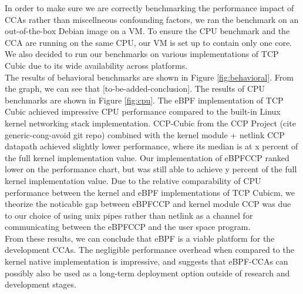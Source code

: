 \documentclass[../main.tex]{subfiles}
\begin{document}
In order to make sure we are correctly benchmarking the performance impact of CCAs rather than miscellneous confounding factors, we ran the benchmark on an out-of-the-box Debian image on a VM. To ensure the CPU benchmark and the CCA are running on the same CPU, our VM is set up to contain only one core. We also decided to run our benchmarks on various implementations of TCP Cubic due to its wide availability across platforms. \\
The results of behavioral benchmarks are shown in Figure \ref{fig:behavioral}. From the graph, we can see that [to-be-added-conclusion]. The results of CPU benchmarks are shown in Figure \ref{fig:cpu}. The eBPF implementation of TCP Cubic achieved impressive CPU performance compared to the built-in Linux kernel networking stack implementation. CCP-Cubic from the CCP Project (cite generic-cong-avoid git repo) combined with the kernel module + netlink CCP datapath achieved slightly lower performance, where its median is at x percent of the full kernel implementation value. Our implementation of eBPFCCP ranked lower on the performance chart, but was still able to achieve y percent of the full kernel implementation value. Due to the relative comparability of CPU performance between the kernel and eBPF implementations of TCP Cubicm, we theorize the noticable gap between eBPFCCP and kernel module CCP was due to our choice of using unix pipes rather than netlink as a channel for communicating between the eBPFCCP and the user space program. \\
From these results, we can conclude that eBPF is a viable platform for the development CCAs. The negligible performance overhead when compared to the kernel native implementation is impressive, and suggests that eBPF-CCAs can possibly also be used as a long-term deployment option outside of research and development stages. 
\end{document}
